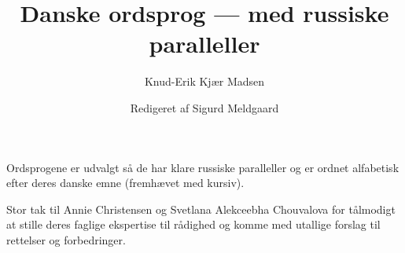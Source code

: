 \documentclass[a4paper]{article}
\title{Danske ordsprog --- med russiske paralleller}
\author{Knud-Erik Kjær Madsen \and Redigeret af Sigurd Meldgaard}
\date{}
\begin{document}
\maketitle
\newenvironment{overslist}
{}{}
\newcommand{\mitem}{\par\hangindent=0.35cm\textbullet\ }
\newcommand{\ordsprog}[2]{
\noindent
\begin{tabu}to \textwidth {XX[2]}
\textdanish{#1}
  &
\begin{overslist}%
\hangindent=0.35cm
\textbullet\
\begin{russian}#2\par
\end{russian}
\end{overslist}%
\end{tabu}
\vskip5mm
}
\newcommand{\ru}[1]{\begin{russian}#1\end{russian}}
\newenvironment{letter}[1]
{\vskip0.5cm \section*{#1}
}
{}
\newcommand{\dui}[1]{\index{dansk}{#1}}
\newcommand{\di}[1]{\index{dansk}{#1}#1}
\newcommand{\did}[2]{\index{dansk}{#1}#2}
\newcommand{\mw}[1]{\index{dansk}{#1}\emph{#1}}
\newcommand{\mwni}[1]{\emph{#1}}
\newcommand{\ri}[1]{\index{russisk}{#1}#1}
\newcommand{\rid}[2]{\index{russisk}{#1}#2}
\newcommand{\fn}[1]{}
Ordsprogene er udvalgt så de har klare russiske paralleller og er ordnet alfabetisk efter deres danske emne (fremhævet med kursiv).

Stor tak til Annie Christensen og Svetlana Alekceebha Chouvalova for tålmodigt at stille deres faglige ekspertise til rådighed og komme med utallige forslag til rettelser og forbedringer.
\end{document}
